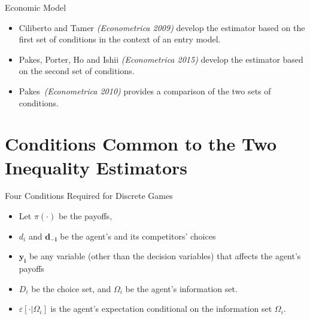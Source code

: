 \documentclass[xcolor=pdftex,dvipsnames,table,mathserif]{beamer}
\begin{document}
\begin{frame}{Economic Model}
\begin{itemize}
\item  Ciliberto and Tamer \textit{(Econometrica 2009)} develop the estimator based on the first set of conditions in the context of an entry model.\\
\vspace{0.1in}
\item Pakes, Porter, Ho and Ishii \textit{(Econometrica 2015)} develop the estimator based on the second set of conditions.\\
\vspace{0.1in}
\item  Pakes\ \textit{(Econometrica 2010)} provides a comparison of the two sets of conditions.\\
\end{itemize}
\end{frame}

\section{Conditions Common to the Two Inequality Estimators}

\begin{frame}{Four Conditions Required for Discrete Games}
\begin{itemize}
\item Let $\pi(\cdot)$ be the payoffs, 
\item $d_i$ and $\mathbf{d_{-i}}$ be the agent's and its competitors' choices
\item $\mathbf{y_i}$ be any variable (other than the decision variables) that affects the agent's payoffs
\item $D_i$ be the choice set, and $\Omega_i$ be the agent's information set.  
\item \large{$\varepsilon[ \cdot | \Omega_i]$} \normalsize is the agent's expectation conditional on the information set $\Omega_i$.
\end{itemize}
\end{frame}

\end{document}
